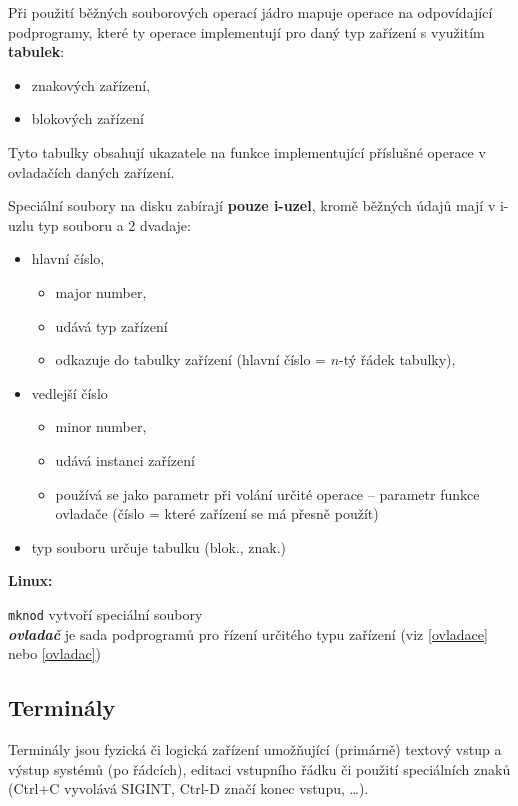 \documentclass[a4paper, 11pt]{article}
\newcommand{\tcmd}[1]{\texttt{#1}}
\begin{document}
Při použití běžných souborových operací jádro mapuje operace na odpovídající podprogramy, které ty operace implementují pro daný typ zařízení s využitím \textbf{tabulek}:
\begin{itemize}
\item znakových zařízení,
\item blokových zařízení
\end{itemize}

Tyto tabulky obsahují ukazatele na funkce implementující příslušné operace v ovladačích daných zařízení.

Speciální soubory na disku zabírají \textbf{pouze i-uzel}, kromě běžných údajů mají v i-uzlu typ souboru a 2 dvadaje:
\begin{itemize}
\item hlavní číslo,
\begin{itemize}
\item major number,
\item udává typ zařízení
\item odkazuje do tabulky zařízení (hlavní číslo = $n$-tý řádek tabulky),
\end{itemize}
\item vedlejší číslo 
\begin{itemize}
\item minor number, 
\item udává instanci zařízení
\item používá se jako parametr při volání určité operace -- parametr funkce ovladače (číslo = které zařízení se má přesně použít)
\end{itemize}
\item typ souboru určuje tabulku (blok., znak.)
\end{itemize}

\textbf{Linux:}

\tcmd{mknod} vytvoří speciální soubory \\[0.2em]
\textit{\textbf{ovladač}} je sada podprogramů pro řízení určitého typu zařízení (viz \ref{ovladace} nebo \ref{ovladac})

\subsection{Terminály}
Terminály jsou fyzická či logická zařízení umožňující (primárně) textový vstup a výstup systémů (po řádcích), editaci vstupního řádku či použití speciálních znaků (Ctrl+C vyvolává SIGINT, Ctrl-D značí konec vstupu, \ldots).
 
\end{document}
